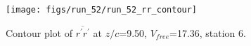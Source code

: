 \begin{figure}[H]
\centering
\texttt{[image: figs/run\_52/run\_52\_rr\_contour]}
\caption{Contour plot of $\overline{r^\prime r^\prime}$ at $z/c$=9.50, $V_{free}$=17.36, station 6.}
\label{fig:run_52_rr_contour}
\end{figure}


